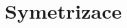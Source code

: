 \documentclass{article}
\begin{document}



\maketitle
\tableofcontents
\newpage



\section{Symetrizace \spicy \spicy}
\end{document}
